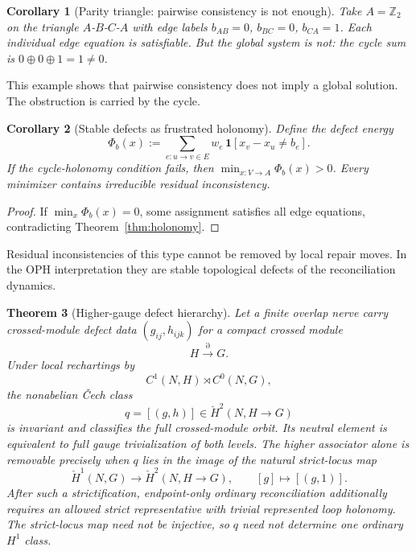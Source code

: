 \documentclass[11pt]{article}
\newtheorem{theorem}{Theorem}[section]
\newtheorem{corollary}[theorem]{Corollary}
\theoremstyle{remark}
\theoremstyle{plain}
\begin{document}
\begin{corollary}[Parity triangle: pairwise consistency is not enough]\label{cor:triangle}
Take $A=\mathbb{Z}_2$ on the triangle $A$-$B$-$C$-$A$ with edge labels $b_{AB}=0$, $b_{BC}=0$, $b_{CA}=1$. Each individual edge equation is satisfiable. But the global system is not: the cycle sum is $0\oplus 0\oplus 1 = 1\neq 0$.
\end{corollary}

This example shows that pairwise consistency does not imply a global solution. The obstruction is
carried by the cycle.

\begin{corollary}[Stable defects as frustrated holonomy]\label{cor:defects}
Define the defect energy
\[
\Phi_b(x) := \sum_{e:u\to v\in E} w_e\,\mathbf{1}\!\left[x_v - x_u \neq b_e\right].
\]
If the cycle-holonomy condition fails, then $\min_{x:V\to A}\Phi_b(x)>0$. Every minimizer contains irreducible residual inconsistency.
\end{corollary}

\begin{proof}
If $\min_x\Phi_b(x)=0$, some assignment satisfies all edge equations, contradicting Theorem~\ref{thm:holonomy}.
\end{proof}

Residual inconsistencies of this type cannot be removed by local repair moves. In the OPH
interpretation they are stable topological defects of the reconciliation dynamics.

\begin{theorem}[Higher-gauge defect hierarchy]\label{thm:higherdefects}
Let a finite overlap nerve carry crossed-module defect data \((g_{ij},h_{ijk})\) for a compact crossed module
\[
H\xrightarrow{\partial} G.
\]
Under local rechartings by
\[
C^1(N,H)\rtimes C^0(N,G),
\]
the nonabelian \v{C}ech class
\[
q=[(g,h)]\in \check H^2(N,H\to G)
\]
is invariant and classifies the full crossed-module orbit. Its neutral element is equivalent to
full gauge trivialization of both levels. The higher associator alone is removable precisely when
\(q\) lies in the image of the natural strict-locus map
\[
\check H^1(N,G)\longrightarrow\check H^2(N,H\to G),\qquad[g]\longmapsto[(g,1)].
\]
After such a strictification, endpoint-only ordinary reconciliation additionally requires an
allowed strict representative with trivial represented loop holonomy. The strict-locus map need
not be injective, so \(q\) need not determine one ordinary \(H^1\) class.
\end{theorem}
\end{document}

